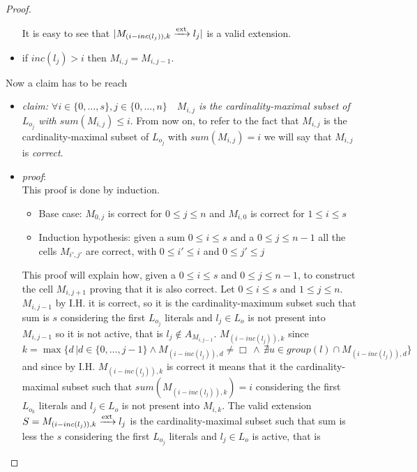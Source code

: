 \begin{proof}
\begin{itemize}
            It is easy to see that $|M_{(i-inc(l_j)),k} \xrightarrow{\text{ext}} l_j|$ is a valid extension.
        \item if $inc(l_j) > i$ then $M_{i,j} =  M_{i,j-1}$.
    \end{itemize}
    Now a claim has to be reach
    \begin{itemize}
        \item \textit{claim: $\forall i \in \{0, \hdots, s\}, j  \in \{ 0, \hdots, n \} \quad M_{i,j}$ is the cardinality-maximal
        subset of $L_{o_j}$ with $sum(M_{i,j}) \le i$}.
        From now on, to refer to the fact that $M_{i,j}$ is the cardinality-maximal
        subset of $L_{o_j}$ with $sum(M_{i,j}) = i$ we will say that $M_{i,j}$ is \textit{correct}.
        \item \textit{proof}:  \\
            This proof is done by induction.
            \begin{itemize}
                \item Base case: $M_{0,j}$ is correct for $0 \le j \le n$ and $M_{i,0}$ is correct for $ 1 \le i \le s$
                \item Induction hypothesis: given a sum $0 \le i \le s$ and a $0 \le j \le n - 1$ all the cells $M_{i',j'}$ 
                are correct, with $0 \le i' \le i$ and $0 \le j' \le j$
            \end{itemize}
            This proof will explain how, given a $0 \le i \le s$ and $0 \le j \le n - 1$, to construct the cell
            $M_{i,j+1}$ proving that it is also correct.
            Let $0 \le i \le s$ and $1 \le j \le n$.
            $M_{i,j-1}$ by I.H. it is correct, so it is the cardinality-maximum subset such that sum is $s$
            considering the first $L_{o_{j}}$ literals and $l_j \in L_o$ is not present 
            into $M_{i,j-1}$ so it is not active, that is $l_j \not\in A_{M_{i,j-1}}$.
            $M_{(i-inc(l_j)),k}$ since $k = \max \{d \, | d \in \{0, \hdots, j-1\} \land M_{(i-inc(l_j)),d} \ne \Box 
            \, \land \, \nexists u \in group(l) \cap M_{(i-inc(l_j)),d} \}$ and since  by I.H. $M_{(i-inc(l_j)),k}$
            is correct  it means that it the cardinality-maximal 
            subset such that $sum(M_{(i-inc(l_j)),k}) = i$ considering the first $L_{o_{k}}$ 
            literals and $l_j \in L_o$ is not present into $M_{i,k}$.
            The valid extension $S = M_{(i-inc(l_j)),k} \xrightarrow{\text{ext}} l_j$ is the cardinality-maximal subset such 
            that sum is less the $s$
            considering the first $L_{o_{j}}$ literals and $l_j \in L_o$ is active, that is

\end{itemize}
\end{proof}
